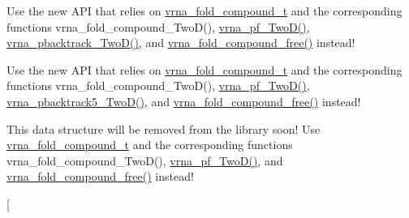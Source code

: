 \begin{DoxyRefList}
\item[\label{deprecated__deprecated000010}%
\hypertarget{deprecated__deprecated000010}{}%
global\+Scope$>$ Global \hyperlink{2Dpfold_8h_ae251288f50dd4ae7d315af0085775f71}{Two\+Dpfold\+\_\+pbacktrack} (\hyperlink{structTwoDpfold__vars}{Two\+Dpfold\+\_\+vars} $\ast$vars, int d1, int d2)]Use the new A\+P\+I that relies on \hyperlink{group__fold__compound_ga1b0cef17fd40466cef5968eaeeff6166}{vrna\+\_\+fold\+\_\+compound\+\_\+t} and the corresponding functions vrna\+\_\+fold\+\_\+compound\+\_\+\+Two\+D(), \hyperlink{group__kl__neighborhood__pf_ga0bc3427689bd09da09b8b3094a27f836}{vrna\+\_\+pf\+\_\+\+Two\+D()}, \hyperlink{group__kl__neighborhood__stochbt_ga14aceef73f83bbde77bb3a0ca06c9d13}{vrna\+\_\+pbacktrack\+\_\+\+Two\+D()}, and \hyperlink{group__fold__compound_gadded6039d63f5d6509836e20321534ad}{vrna\+\_\+fold\+\_\+compound\+\_\+free()} instead! 
\item[\label{deprecated__deprecated000011}%
\hypertarget{deprecated__deprecated000011}{}%
global\+Scope$>$ Global \hyperlink{2Dpfold_8h_a13430ac6a7f90df426774f131647d2c7}{Two\+Dpfold\+\_\+pbacktrack5} (\hyperlink{structTwoDpfold__vars}{Two\+Dpfold\+\_\+vars} $\ast$vars, int d1, int d2, unsigned int length)]Use the new A\+P\+I that relies on \hyperlink{group__fold__compound_ga1b0cef17fd40466cef5968eaeeff6166}{vrna\+\_\+fold\+\_\+compound\+\_\+t} and the corresponding functions vrna\+\_\+fold\+\_\+compound\+\_\+\+Two\+D(), \hyperlink{group__kl__neighborhood__pf_ga0bc3427689bd09da09b8b3094a27f836}{vrna\+\_\+pf\+\_\+\+Two\+D()}, \hyperlink{group__kl__neighborhood__stochbt_ga6504913303bc325659c365d5f59b41e0}{vrna\+\_\+pbacktrack5\+\_\+\+Two\+D()}, and \hyperlink{group__fold__compound_gadded6039d63f5d6509836e20321534ad}{vrna\+\_\+fold\+\_\+compound\+\_\+free()} instead! 
\item[\label{deprecated__deprecated000006}%
\hypertarget{deprecated__deprecated000006}{}%
Class \hyperlink{structTwoDpfold__vars}{Two\+Dpfold\+\_\+vars} ]This data structure will be removed from the library soon! Use \hyperlink{group__fold__compound_ga1b0cef17fd40466cef5968eaeeff6166}{vrna\+\_\+fold\+\_\+compound\+\_\+t} and the corresponding functions vrna\+\_\+fold\+\_\+compound\+\_\+\+Two\+D(), \hyperlink{group__kl__neighborhood__pf_ga0bc3427689bd09da09b8b3094a27f836}{vrna\+\_\+pf\+\_\+\+Two\+D()}, and \hyperlink{group__fold__compound_gadded6039d63f5d6509836e20321534ad}{vrna\+\_\+fold\+\_\+compound\+\_\+free()} instead!  
\item[\label{deprecated__deprecated000009}%
\hypertarget{deprecated__deprecated000009}{}%

\end{DoxyRefList}
